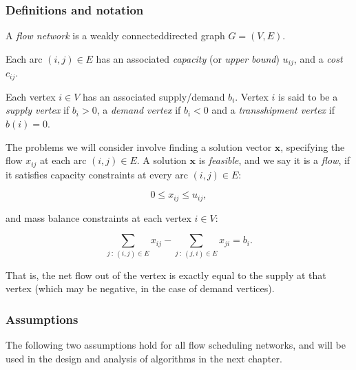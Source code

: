 
\subsubsection{Definitions and notation}

A \emph{flow network} is a weakly connected\footnotemark directed graph $G=(V,E)$.

Each arc $(i,j)\in E$ has an associated \emph{capacity} (or \emph{upper	bound}\footnotemark) $u_{ij}$, and a \emph{cost} $c_{ij}$.

Each vertex $i\in V$ has an associated supply/demand $b_{i}$. Vertex $i$ is said to be a \emph{supply vertex} if $b_{i}>0$, a \emph{demand vertex} if $b_{i}<0$ and a \emph{transshipment vertex} if $b(i)=0$.

The problems we will consider involve finding a solution vector $\mathbf{x}$,
specifying the flow $x_{ij}$ at each arc $(i,j)\in E$. A solution
$\mathbf{x}$ is \emph{feasible}, and we say it is a \emph{flow}, if it satisfies capacity constraints at every arc $(i,j) \in E$:

\begin{equation} \label{eq:capacity-constraints}
0\leq x_{ij}\leq u_{ij},
\end{equation}

and mass balance constraints at each vertex $i \in V$:

\begin{equation} \label{eq:mass-balance-constraints}
\sum_{j\::\:(i,j)\in E}x_{ij}-\sum_{j\::\:(j,i)\in E}x_{ji}=b_i.
\end{equation}

That is, the net flow out of the vertex is exactly equal to the supply
at that vertex (which may be negative, in the case of demand vertices).

\subsubsection{Assumptions}

The following two assumptions hold for all flow scheduling networks, and will be used in the design and analysis of algorithms in the next chapter. \\

